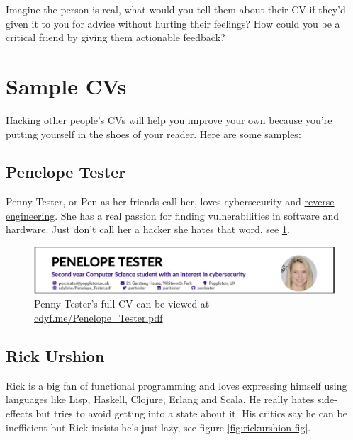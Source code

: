 \documentclass[
]{book}
\begin{document}
Imagine the person is real, what would you tell them about their CV if they'd given it to you for advice without hurting their feelings? How could you be a critical friend by giving them actionable feedback?

\hypertarget{sample-cvs}{%
\section{Sample CVs}\label{sample-cvs}}

Hacking other people's CVs will help you improve your own because you're putting yourself in the shoes of your reader. Here are some samples:

\hypertarget{pen-tester}{%
\subsection{Penelope Tester}\label{pen-tester}}

Penny Tester, or Pen as her friends call her, loves cybersecurity and \href{https://en.wikipedia.org/wiki/Reverse_engineering}{reverse engineering}. She has a real passion for finding vulnerabilities in software and hardware. Just don't call her a hacker she hates that word, see \ref{fig:pentester-fig}.

\begin{figure}

{\centering \includegraphics[width=1\linewidth]{images/pen_tester} 

}

\caption{Penny Tester's full CV can be viewed at \href{https://www.cdyf.me/Penelope_Tester.pdf}{cdyf.me/Penelope\_Tester.pdf}}\label{fig:pentester-fig}
\end{figure}



\hypertarget{rick-urshion}{%
\subsection{Rick Urshion}\label{rick-urshion}}

Rick is a big fan of functional programming and loves expressing himself using languages like Lisp, Haskell, Clojure, Erlang and Scala. He really hates side-effects but tries to avoid getting into a state about it. His critics say he can be inefficient but Rick insists he's just lazy, see figure \ref{fig:rickurshion-fig}.
\end{document}

